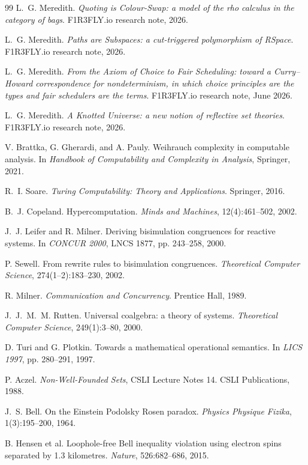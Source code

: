 \begin{thebibliography}{99}
L.~G. Meredith. \emph{Quoting is Colour-Swap: a model of the rho calculus in the
category of bags}. F1R3FLY.io research note, 2026.

L.~G. Meredith. \emph{Paths are Subspaces: a cut-triggered polymorphism of RSpace}.
F1R3FLY.io research note, 2026.

L.~G. Meredith. \emph{From the Axiom of Choice to Fair Scheduling: toward a
Curry--Howard correspondence for nondeterminism, in which choice principles are the
types and fair schedulers are the terms}. F1R3FLY.io research note, June 2026.

L.~G. Meredith. \emph{A Knotted Universe: a new notion of reflective set theories}.
F1R3FLY.io research note, 2026.

V. Brattka, G. Gherardi, and A. Pauly. Weihrauch complexity in computable analysis.
In \emph{Handbook of Computability and Complexity in Analysis}, Springer, 2021.

R.~I. Soare. \emph{Turing Computability: Theory and Applications}. Springer, 2016.

B.~J. Copeland. Hypercomputation. \emph{Minds and Machines}, 12(4):461--502, 2002.

J.~J. Leifer and R. Milner. Deriving bisimulation congruences for reactive systems.
In \emph{CONCUR 2000}, LNCS 1877, pp. 243--258, 2000.

P. Sewell. From rewrite rules to bisimulation congruences.
\emph{Theoretical Computer Science}, 274(1--2):183--230, 2002.

R. Milner. \emph{Communication and Concurrency}. Prentice Hall, 1989.

J.~J.~M.~M. Rutten. Universal coalgebra: a theory of systems.
\emph{Theoretical Computer Science}, 249(1):3--80, 2000.

D. Turi and G. Plotkin. Towards a mathematical operational semantics.
In \emph{LICS 1997}, pp. 280--291, 1997.

P. Aczel. \emph{Non-Well-Founded Sets}, CSLI Lecture Notes 14. CSLI Publications, 1988.

J.~S. Bell. On the Einstein Podolsky Rosen paradox.
\emph{Physics Physique Fizika}, 1(3):195--200, 1964.

B. Hensen et al. Loophole-free Bell inequality violation using electron spins separated
by 1.3 kilometres. \emph{Nature}, 526:682--686, 2015.


\end{thebibliography}
